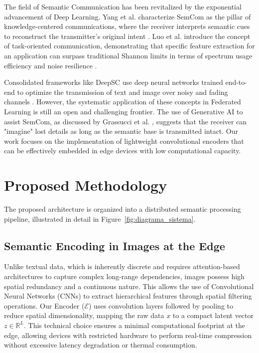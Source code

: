 \documentclass[conference,twocolumn]{IEEEtran}
\begin{document}
The field of Semantic Communication has been revitalized by the exponential advancement of Deep Learning. Yang et al. characterize SemCom as the pillar of knowledge-centered communications, where the receiver interprets semantic cues to reconstruct the transmitter's original intent \cite{yang2022semantic}. Luo et al. introduce the concept of task-oriented communication, demonstrating that specific feature extraction for an application can surpass traditional Shannon limits in terms of spectrum usage efficiency and noise resilience \cite{luo2022semantic}.

Consolidated frameworks like DeepSC use deep neural networks trained end-to-end to optimize the transmission of text and image over noisy and fading channels \cite{xie2021deep}. However, the systematic application of these concepts in Federated Learning is still an open and challenging frontier. The use of Generative AI to assist SemCom, as discussed by Grassucci et al. \cite{grassucci2023genai_meets_semcom}, suggests that the receiver can "imagine" lost details as long as the semantic base is transmitted intact. Our work focuses on the implementation of lightweight convolutional encoders that can be effectively embedded in edge devices with low computational capacity.

\section{Proposed Methodology}

The proposed architecture is organized into a distributed semantic processing pipeline, illustrated in detail in Figure~\ref{fig:diagrama_sistema}.

\subsection{Semantic Encoding in Images at the Edge}
Unlike textual data, which is inherently discrete and requires attention-based architectures to capture complex long-range dependencies, images possess high spatial redundancy and a continuous nature. This allows the use of Convolutional Neural Networks (CNNs) to extract hierarchical features through spatial filtering operations. Our Encoder ($\mathcal{E}$) uses convolution layers followed by pooling to reduce spatial dimensionality, mapping the raw data $x$ to a compact latent vector $z \in \mathbb{R}^L$. This technical choice ensures a minimal computational footprint at the edge, allowing devices with restricted hardware to perform real-time compression without excessive latency degradation or thermal consumption.
\end{document}
